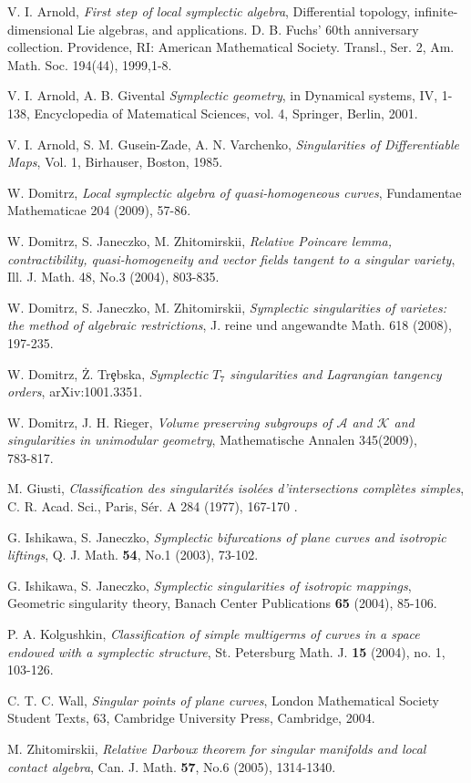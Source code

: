 \documentclass{amsart}
\theoremstyle{definition}
\numberwithin{equation}{section}
\begin{document}

\begin{thebibliography}{AAAA}

 V. I. Arnold, \emph{ First step of local symplectic algebra},
Differential topology, infinite-dimensional Lie algebras, and
applications. D. B. Fuchs' 60th anniversary collection.
Providence, RI: American Mathematical Society. Transl., Ser. 2,
Am. Math. Soc. 194(44), 1999,1-8.

 V. I. Arnold, A. B. Givental \emph{Symplectic geometry}, in Dynamical systems, IV, 1-138, Encyclopedia of Matematical Sciences, vol. 4,
Springer, Berlin, 2001.

 V. I. Arnold, S. M. Gusein-Zade, A. N. Varchenko,
\emph{ Singularities of Differentiable Maps}, Vol. 1, Birhauser,
Boston, 1985.

 W. Domitrz,
\emph{Local symplectic algebra of quasi-homogeneous curves}, Fundamentae Mathematicae 204 (2009), 57-86.

 W. Domitrz, S. Janeczko, M. Zhitomirskii,
\emph{Relative Poincare lemma, contractibility, quasi-homogeneity
and vector fields tangent to a singular variety}, Ill. J. Math.
48, No.3 (2004), 803-835.

 W. Domitrz, S. Janeczko, M. Zhitomirskii,
\emph{Symplectic singularities of varietes: the method of
algebraic restrictions}, J. reine und angewandte Math. 618 (2008),
197-235.

 W. Domitrz, \.{Z}. Tr\c{e}bska, \emph{Symplectic $T_7$ singularities and Lagrangian tangency orders}, arXiv:1001.3351.

 W. Domitrz, J. H. Rieger, \emph{Volume preserving subgroups of
$\mathcal A$ and $\mathcal K$ and singularities in unimodular
geometry}, Mathematische Annalen
   345(2009), 783-817.

 M. Giusti, \emph{Classification des singularit\'es isol\'ees d'intersections compl\`etes simples},
C. R. Acad. Sci., Paris, Sér. A 284 (1977), 167-170 .

 G. Ishikawa, S. Janeczko, \emph{ Symplectic bifurcations of plane curves and isotropic liftings},
Q. J. Math. \textbf{54}, No.1 (2003), 73-102.

 G. Ishikawa, S. Janeczko, \emph{ Symplectic singularities of isotropic mappings},
Geometric singularity theory, Banach Center Publications
\textbf{65} (2004), 85-106.

 P. A. Kolgushkin, \emph{Classification of simple multigerms of curves
in a space endowed with a symplectic structure}, St. Petersburg
Math. J. \textbf{15} (2004), no. 1, 103-126.

 C. T. C. Wall,
\emph{Singular points of plane curves}, London Mathematical
Society Student Texts, 63, Cambridge University Press, Cambridge,
2004.

 M. Zhitomirskii, {\em Relative Darboux
theorem for singular manifolds and local contact algebra}, Can. J.
Math. \textbf{57}, No.6 (2005), 1314-1340.
\end{thebibliography}
\end{document}
